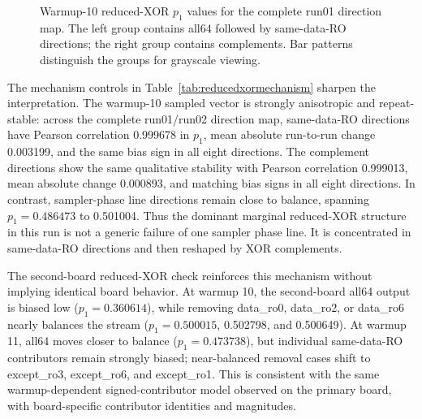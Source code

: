 \documentclass[journal]{IEEEtran}
\begin{document}
\begin{figure}[t]
{}
\caption{Warmup-10 reduced-XOR $p_1$ values for the complete run01 direction map. The left group contains all64 followed by same-data-RO directions; the right group contains complements. Bar patterns distinguish the groups for grayscale viewing.}
\label{fig:reducedxor}
\end{figure}

The mechanism controls in Table~\ref{tab:reducedxormechanism} sharpen the interpretation. The warmup-10 sampled vector is strongly anisotropic and repeat-stable: across the complete run01/run02 direction map, same-data-RO directions have Pearson correlation 0.999678 in $p_1$, mean absolute run-to-run change 0.003199, and the same bias sign in all eight directions. The complement directions show the same qualitative stability with Pearson correlation 0.999013, mean absolute change 0.000893, and matching bias signs in all eight directions. In contrast, sampler-phase line directions remain close to balance, spanning $p_1=0.486473$ to 0.501004. Thus the dominant marginal reduced-XOR structure in this run is not a generic failure of one sampler phase line. It is concentrated in same-data-RO directions and then reshaped by XOR complements.

The second-board reduced-XOR check reinforces this mechanism without implying identical board behavior. At warmup 10, the second-board all64 output is biased low ($p_1=0.360614$), while removing data\_ro0, data\_ro2, or data\_ro6 nearly balances the stream ($p_1=0.500015$, 0.502798, and 0.500649). At warmup 11, all64 moves closer to balance ($p_1=0.473738$), but individual same-data-RO contributors remain strongly biased; near-balanced removal cases shift to except\_ro3, except\_ro6, and except\_ro1. This is consistent with the same warmup-dependent signed-contributor model observed on the primary board, with board-specific contributor identities and magnitudes.
\end{document}
